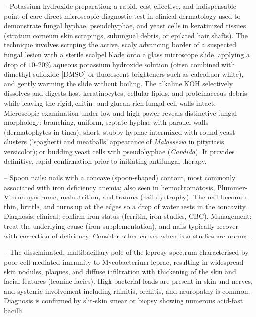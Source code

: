 -- Potassium hydroxide preparation; a rapid, cost-effective, and indispensable point-of-care direct microscopic diagnostic test in clinical dermatology used to demonstrate fungal hyphae, pseudohyphae, and yeast cells in keratinized tissues (stratum corneum skin scrapings, subungual debris, or epilated hair shafts). The technique involves scraping the active, scaly advancing border of a suspected fungal lesion with a sterile scalpel blade onto a glass microscope slide, applying a drop of $10\text{--}20\%$ aqueous potassium hydroxide solution (often combined with dimethyl sulfoxide [DMSO] or fluorescent brighteners such as calcofluor white), and gently warming the slide without boiling. The alkaline KOH selectively dissolves and digests host keratinocytes, cellular lipids, and proteinaceous debris while leaving the rigid, chitin- and glucan-rich fungal cell walls intact. Microscopic examination under low and high power reveals distinctive fungal morphology: branching, uniform, septate hyphae with parallel walls (dermatophytes in tinea); short, stubby hyphae intermixed with round yeast clusters ('spaghetti and meatballs' appearance of \textit{Malassezia} in pityriasis versicolor); or budding yeast cells with pseudohyphae (\textit{Candida}). It provides definitive, rapid confirmation prior to initiating antifungal therapy.

-- Spoon nails: nails with a concave (spoon-shaped) contour, most commonly associated with iron deficiency anemia; also seen in hemochromatosis, Plummer-Vinson syndrome, malnutrition, and trauma (nail dystrophy). The nail becomes thin, brittle, and turns up at the edges so a drop of water rests in the concavity. Diagnosis: clinical; confirm iron status (ferritin, iron studies, CBC). Management: treat the underlying cause (iron supplementation), and nails typically recover with correction of deficiency. Consider other causes when iron studies are normal.

-- The disseminated, multibacillary pole of the leprosy spectrum characterised by poor cell-mediated immunity to Mycobacterium leprae, resulting in widespread skin nodules, plaques, and diffuse infiltration with thickening of the skin and facial features (leonine facies). High bacterial loads are present in skin and nerves, and systemic involvement including rhinitis, orchitis, and neuropathy is common. Diagnosis is confirmed by slit-skin smear or biopsy showing numerous acid-fast bacilli.

